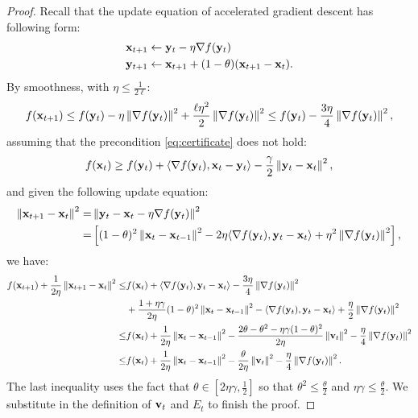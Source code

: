 \begin{proof}
Recall that the update equation of accelerated gradient descent has following form:
\begin{align*}
\mathbf{x}_{t+1} &\leftarrow \mathbf{y}_t - \eta \nabla f (\mathbf{y}_t) \\
\mathbf{y}_{t+1} &\leftarrow \mathbf{x}_{t+1} + (1-\theta) (\mathbf{x}_{t+1} - \mathbf{x}_t).
\end{align*}
By smoothness, with $\eta \le \frac{1}{2\ell}$:
\begin{align}
f(\mathbf{x}_{t+1}) \le f(\mathbf{y}_t) - \eta\left\|{\nabla f(\mathbf{y}_t)}\right\|^2 + \frac{\ell\eta^2}{2}\left\|{\nabla f(\mathbf{y}_t)}\right\|^2
\le f(\mathbf{y}_t) - \frac{3\eta}{4}\left\|{\nabla f(\mathbf{y}_t)}\right\|^2, \label{eq:energy_smooth}
\end{align}
assuming that the precondition \eqref{eq:certificate} does not hold:
\begin{align}
f(\mathbf{x}_t) \ge f(\mathbf{y}_t) + \langle \nabla f(\mathbf{y}_t), \mathbf{x}_t - \mathbf{y}_t\rangle -
\frac{\gamma}{2}\left\|{\mathbf{y}_t - \mathbf{x}_t}\right\|^2,
\label{eq:energy_almost_convex}
\end{align}
and given the following update equation:
\begin{align}
\left\|{\mathbf{x}_{t+1} - \mathbf{x}_t}\right\|^2
 =& \left\|{\mathbf{y}_t - \mathbf{x}_t  - \eta \nabla f (\mathbf{y}_t)}\right\|^2  \nonumber\\
 =& \left[(1-\theta)^2\left\|{\mathbf{x}_t - \mathbf{x}_{t-1}}\right\|^2
 - 2\eta\langle \nabla f(\mathbf{y}_t), \mathbf{y}_t - \mathbf{x}_t \rangle
 + \eta^2 \left\|{\nabla f(\mathbf{y}_t)}\right\|^2 \right], \label{eq:energy_momentum}
\end{align}
we have:
\begin{align*}
f(\mathbf{x}_{t+1})
+ \frac{1}{2\eta}\left\|{\mathbf{x}_{t+1} - \mathbf{x}_{t}}\right\|^2
\le& f(\mathbf{x}_t) + \langle \nabla f(\mathbf{y}_t), \mathbf{y}_t - \mathbf{x}_t \rangle - \frac{3\eta}{4}\left\|{\nabla f(\mathbf{y}_t)}\right\|^2 \\
&+\frac{1+ \eta\gamma}{2\eta}(1-\theta)^2 \left\|{\mathbf{x}_t - \mathbf{x}_{t-1}}\right\|^2 - \langle \nabla f(\mathbf{y}_t), \mathbf{y}_t - \mathbf{x}_t \rangle
 + \frac{\eta}{2} \left\|{\nabla f(\mathbf{y}_t)}\right\|^2\\
\le& f(\mathbf{x}_{t}) + \frac{1}{2\eta}\left\|{\mathbf{x}_{t} - \mathbf{x}_{t-1}}\right\|^2
 - \frac{2\theta-\theta^2 - \eta\gamma(1-\theta)^2}{2\eta}\left\|{\mathbf{v}_{t}}\right\|^2 - \frac{\eta}{4}\left\|{\nabla f(\mathbf{y}_{t})}\right\|^2 \\
\le& f(\mathbf{x}_{t}) + \frac{1}{2\eta}\left\|{\mathbf{x}_{t} - \mathbf{x}_{t-1}}\right\|^2 - \frac{\theta}{2\eta}\left\|{\mathbf{v}_t}\right\|^2 - \frac{\eta}{4}\left\|{\nabla f(\mathbf{y}_{t})}\right\|^2.
\end{align*}
The last inequality uses the fact that $\theta \in [2\eta \gamma, \frac{1}{2}]$ 
so that $\theta^2 \le \frac{\theta}{2}$ and $\eta\gamma \le \frac{\theta}{2}$. 
We substitute in the definition of $\mathbf{v}_t$ and $E_t$ to finish the proof.
\end{proof}
